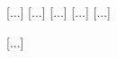 \documentclass[12pt, a4paper]{article}
\begin{document}
\begin{center}
{                                                                                                                                                                                                    [...]
                                                                                                                                                                                                    [...]
                                                                                                                                                                                                    [...]
                                                                                                                                                                                                    [...]
                                                                                                                                                                                                    [...]

                                                                                                                                                                                                    [...]

}
\end{center}
\end{document}
